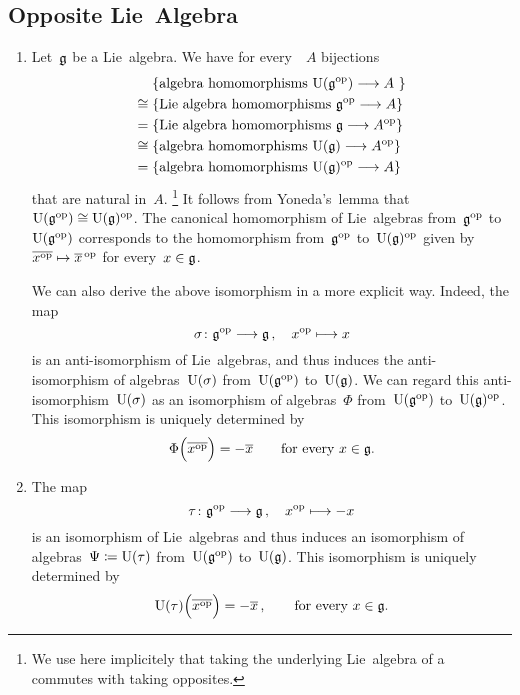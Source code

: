 \subsection{Opposite Lie~Algebra}

\begin{example}
	\label{uea of opposite by first principles}
	\leavevmode
	\begin{enumerate}
		\item
			Let~$\mathfrak{g}$ be a Lie~algebra.
			We have for every~{\algebra{$\kf$}}~$A$ bijections
			\begin{align*}
				{}&
				\{ \text{algebra homomorphisms~$\Univ(\glie^\op) \to A$   } \}
				\\
				\cong{}&
				\{ \text{Lie~algebra homomorphisms~$\glie^\op \to A$} \}
				\\
				={}&
				\{ \text{Lie~algebra homomorphisms~$\glie \to A^\op$} \}
				\\
				\cong{}&
				\{ \text{algebra homomorphisms~$\Univ(\glie) \to A^\op$} \}
				\\
				={}&
				\{ \text{algebra homomorphisms~$\Univ(\glie)^\op \to A$} \}
			\end{align*}
			that are natural in~$A$.%
			\footnote{
				We use here implicitely that taking the underlying Lie~algebra of a~{\algebra{$\kf$}} commutes with taking opposites.}
				It follows from Yoneda’s~lemma that~$\operatorname{U}(\mathfrak{g}^{\mathrm{op}}) \cong \operatorname{U}(\mathfrak{g})^{\mathrm{op}}$.
			The canonical homomorphism of Lie~algebras from~$\mathfrak{g}^{\mathrm{op}}$ to~$\operatorname{U}(\mathfrak{g}^{\mathrm{op}})$ corresponds to the homomorphism from~$\mathfrak{g}^{\mathrm{op}}$ to~$\operatorname{U}(\mathfrak{g})^{\mathrm{op}}$ given by~$\class{x^{\op}} \mapsto \class{x}{}^{\,\op}$ for every~$x \in \mathfrak{g}$.

			We can also derive the above isomorphism in a more explicit way.
			Indeed, the map
			\[
				\sigma
				\colon
				\glie^{\op}
				\to
				\glie \,,
				\quad
				x^{\op}
				\mapsto
				x
			\]
			is an anti-isomorphism of Lie~algebras, and thus induces the anti-isomorphism of algebras~$\operatorname{U}(\sigma)$ from~$\operatorname{U}(\mathfrak{g}^{\mathrm{op}})$ to~$\operatorname{U}(\mathfrak{g})$.
			We can regard this anti-isomorphism~$\operatorname{U}(\sigma)$ as an isomorphism of algebras~$\Phi$ from~$\operatorname{U}(\mathfrak{g}^{\mathrm{op}})$ to~$\operatorname{U}(\mathfrak{g})^{\mathrm{op}}$.
			This isomorphism is uniquely determined by
			\[
				\Phi\Bigl( \overline{x^{\mathrm{op}}} \Bigr)
				=
				- \overline{x}
				\qquad
				\text{for every~$x \in \mathfrak{g}$.}
			\]
		\item
			The map
			\[
				\tau
				\colon
				\glie^{\op}
				\to
				\glie \,,
				\quad
				x^{\op}
				\mapsto
				-x
			\]
			is an isomorphism of Lie~algebras and thus induces an isomorphism of algebras~$\Psi \coloneqq \operatorname{U}(\tau)$ from~$\operatorname{U}(\mathfrak{g}^{\mathrm{op}})$ to~$\operatorname{U}(\mathfrak{g})$.
			This isomorphism is uniquely determined by
			\[
				\operatorname{U}(\tau)\Bigl( \overline{x^{\mathrm{op}}} \Bigr)
				=
				- \overline{x} \,,
				\qquad
				\text{for every~$x \in \mathfrak{g}$.}
			\]
	\end{enumerate}
\end{example}




